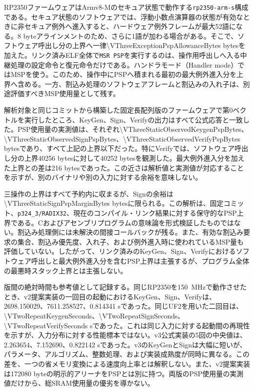 \documentclass[a4paper,10pt]{ltjsarticle}
\theoremstyle{definition}
\theoremstyle{remark}
\begin{document}
RP2350ファームウェアはArmv8-Mのセキュア状態で動作する\texttt{rp2350-arm-s}構成である。セキュア状態のソフトウェアでは、浮動小数点演算器の状態が有効なときに非セキュア例外へ進入すると、ハードウェア例外フレームが最大52語になる。8 byteアラインメントのため、さらに1語が加わる場合がある\cite{arm-stack-sizing-2016}。そこで、ソフトウェア呼出し分の上界へ一律\num{\VThreeExceptionPspAllowanceBytes} bytesを加えた。リンク済みELF全体で\texttt{MSR PSP}を実行するのは、操作用呼出しへ入る中継処理の設定命令と復元命令だけである。ハンドラモード（Handler mode）ではMSPを使う。このため、操作中にPSPへ積まれる最初の最大例外進入分を上界へ含める。一方、割込み処理のソフトウェアフレームと割込みの入れ子は、別途評価すべきMSP使用量として残す。

解析対象と同じコミットから構築した固定長配列版のファームウェアで第0ベクトルを実行したところ、KeyGen、Sign、Verifyの出力はすべて公式応答と一致した。PSP使用量の実測値は、それぞれ\num{\VThreeStaticObservedKeygenPspBytes}、\num{\VThreeStaticObservedSignPspBytes}、\num{\VThreeStaticObservedVerifyPspBytes} bytesであり、すべて上記の上界以下だった。特にVerifyでは、ソフトウェア呼出し分の上界\num{40256} bytesに対して\num{40252} bytesを観測した。最大例外進入分を加えた上界との差は\num{216} bytesであった。この近さは解析値と実測値が対応することを示すが、別のバイナリや別の入力に対する余裕を意味しない。

三操作の上界はすべて予約内に収まるが、Signの余裕は\num{\VThreeStaticSignPspMarginBytes} bytesに限られる。この解析は、固定コミット、\texttt{p324\_3/RADIX32}、現在のコンパイル・リンク結果に対する保守的なPSP上界である。Cおよびアセンブリプログラムの意味論を形式検証したものではない。割込み処理側には未解決の間接コールバックが残る。また、有効な割込み要求の集合、割込み優先度、入れ子、および例外進入時に使われているMSP量も評価していない。したがって、リンク済みのKeyGen、Sign、Verifyにおけるソフトウェア呼出しと最大例外進入分を含むPSP上界は主張するが、プログラム全体の最悪時スタック上界とは主張しない。

版間の絶対時間も参考値として記録する。同じRP2350を\SI{150}{\mega\hertz}で動作させたとき、v2提案実装の一回目の起動におけるKeyGen、Sign、Verifyは、\num{2698.150029}、\num{7611.258527}、\num{0.814341} sであった。同じUF2を用いた二回目は、\num{\VTwoRepeatKeygenSeconds}、\num{\VTwoRepeatSignSeconds}、\num{\VTwoRepeatVerifySeconds} sであった。これは同じ入力に対する起動間の再現性を示すが、入力分布に対する性能標本ではない。v3公式実装の5回の中央値は、\num{2.263654}、\num{7.152690}、\num{0.822142} sであった。v3のKeyGenとSignは大幅に短いが、パラメータ、アルゴリズム、整数処理、および実装成熟度が同時に異なる。この差を、一つの省メモリ変換による速度向上率とは解釈しない。また、v2提案実装は\num{172080} byteの明示的アリーナをPSPとは別に持つ。両版のPSP使用量の実測値だけから、総SRAM使用量の優劣を導かない。
\end{document}
